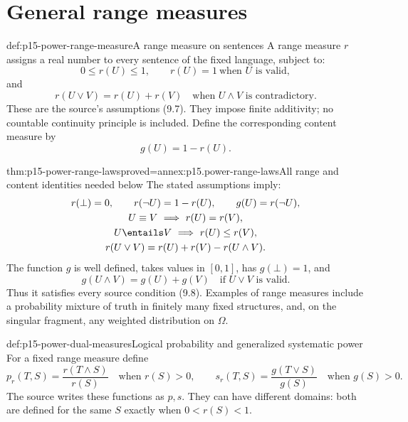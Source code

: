 \section{General range measures}
\label{sec:p15-power-range}

\begin{hbdefinition}{def:p15-power-range-measure}{A range measure on sentences}
A range measure \(r\) assigns a real number
to every sentence of the fixed language,
subject to:
\[
 0\le r(U)\le1,\qquad r(U)=1\ \text{when }U\text{ is valid},
\]
and
\[
 r(U\lor V)=r(U)+r(V)
          \quad\text{when }U\land V\text{ is contradictory}.
\]
These are the source's assumptions (9.7).
They impose finite additivity; no countable
continuity principle is included.
Define the corresponding content measure by
\[
                            g(U)=1-r(U).
\]
\end{hbdefinition}

\begin{hbtheorem}{thm:p15-power-range-laws}{proved=annex:p15.power-range-laws}{All range and content identities needed below}
The stated assumptions imply:
\[
\begin{gathered}
 r(\bot)=0,\qquad r(\neg U)=1-r(U),\qquad g(U)=r(\neg U),\\
 U\equiv V\ \Longrightarrow\ r(U)=r(V),\\
 U\entails V\ \Longrightarrow\ r(U)\le r(V),\\
 r(U\lor V)=r(U)+r(V)-r(U\land V).
\end{gathered}
\]
The function \(g\) is well defined, takes
values in \([0,1]\), has \(g(\bot)=1\), and
\[
 g(U\land V)=g(U)+g(V)
                 \quad\text{if }U\lor V\text{ is valid}.
\]
Thus it satisfies every source condition (9.8).
Examples of range measures include a probability
mixture of truth in finitely many fixed structures,
and, on the singular fragment, any weighted
distribution on \(\Omega\).
\end{hbtheorem}

\begin{hbdefinition}{def:p15-power-dual-measures}{Logical probability and generalized systematic power}
For a fixed range measure define
\[
 p_r(T,S)=\frac{r(T\land S)}{r(S)}
                       \quad\text{when }r(S)>0,
 \qquad
 s_r(T,S)=\frac{g(T\lor S)}{g(S)}
                       \quad\text{when }g(S)>0.
\]
The source writes these functions as \(p,s\).
They can have different domains: both
are defined for the same \(S\) exactly
when \(0<r(S)<1\).
\end{hbdefinition}

